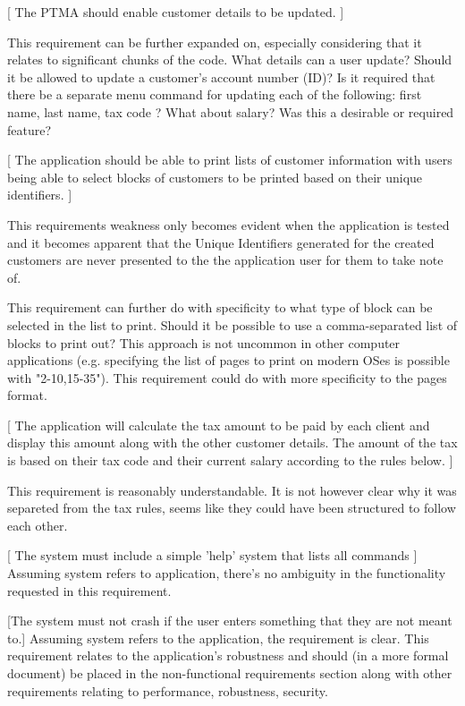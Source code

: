[ The PTMA should enable customer details to be updated. ]

This requirement can be further expanded on, especially considering that it relates to significant chunks of the code. 
What details can a user update? Should it be allowed to update a customer's account number (ID)?
Is it required that there be a separate menu command for updating each of the following: first name, last name, tax code ? What about salary? Was this a desirable or required feature?    


[ The application should be able to print lists of customer information with users being able to select blocks of customers to be printed based on their unique identifiers. ]

This requirements weakness only becomes evident when the application is tested and it becomes apparent that the Unique Identifiers generated for the created customers are never presented to the the application user for them to take note of. 

This requirement can further do with specificity to what type of block can be selected in the list to print. 
Should it be possible to use a comma-separated list of blocks to print out? This approach is not uncommon in other computer applications (e.g. specifying the list of pages to print on modern OSes is possible with "2-10,15-35"). This requirement could do with more specificity to the pages format. 

[ The application will calculate the tax amount to be paid by each client and display this amount along with the other customer details. The amount of the tax is based on their tax
code and their current salary according to the rules below. ]

This requirement is reasonably understandable. It is not however clear why it was separeted from the tax rules, seems like they could have been structured to follow each other. 

[ The system must include a simple 'help' system that lists all commands ]
Assuming system refers to application, there's no ambiguity in the functionality requested in this requirement. 

[The system must not crash if the user enters something that they are not meant to.]
Assuming system refers to the application, the requirement is clear. This requirement relates to the application's robustness and should (in a more formal document) be placed in the non-functional requirements section along with other requirements relating to performance, robustness, security. 

